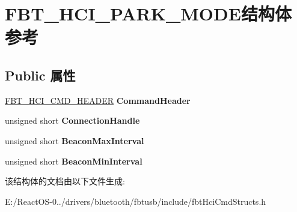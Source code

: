\hypertarget{struct_f_b_t___h_c_i___p_a_r_k___m_o_d_e}{}\section{F\+B\+T\+\_\+\+H\+C\+I\+\_\+\+P\+A\+R\+K\+\_\+\+M\+O\+D\+E结构体 参考}
\label{struct_f_b_t___h_c_i___p_a_r_k___m_o_d_e}
\subsection*{Public 属性}
\begin{DoxyCompactItemize}
\item 
\mbox{\label{struct_f_b_t___h_c_i___p_a_r_k___m_o_d_e_ad7590dd401edec8d571f2fa766a022da}} 
\hyperlink{struct_f_b_t___h_c_i___c_m_d___h_e_a_d_e_r}{F\+B\+T\+\_\+\+H\+C\+I\+\_\+\+C\+M\+D\+\_\+\+H\+E\+A\+D\+ER} {\bfseries Command\+Header}
\item 
\mbox{\label{struct_f_b_t___h_c_i___p_a_r_k___m_o_d_e_a959f26d66fbb6b1d28c6cda1026d77e4}} 
unsigned short {\bfseries Connection\+Handle}
\item 
\mbox{\label{struct_f_b_t___h_c_i___p_a_r_k___m_o_d_e_ad9230270594dddcc991088582e06be0a}} 
unsigned short {\bfseries Beacon\+Max\+Interval}
\item 
\mbox{\label{struct_f_b_t___h_c_i___p_a_r_k___m_o_d_e_a50ac2c4838ab01058301720cd39f0f53}} 
unsigned short {\bfseries Beacon\+Min\+Interval}
\end{DoxyCompactItemize}


该结构体的文档由以下文件生成\+:\begin{DoxyCompactItemize}
\item 
E\+:/\+React\+O\+S-\/0../drivers/bluetooth/fbtusb/include/fbt\+Hci\+Cmd\+Structs.\+h\end{DoxyCompactItemize}
